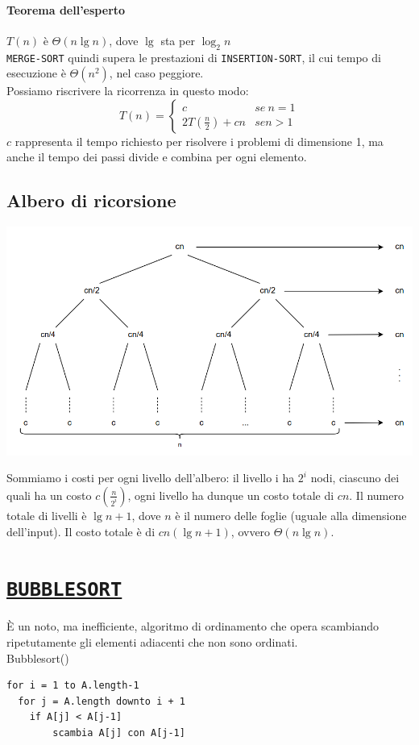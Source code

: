 \documentclass[11pt,a4paper]{article}
\begin{document}
\paragraph{Teorema dell'esperto} $T(n)$ è $\Theta(n \lg n)$, dove $\lg$ sta per $\log_2 n$
\medskip\\
\texttt{MERGE-SORT} quindi supera le prestazioni di \texttt{INSERTION-SORT}, il cui tempo di esecuzione è $\Theta(n^2)$, nel caso peggiore.\medskip\\
Possiamo riscrivere la ricorrenza in questo modo:
\[T(n)= \begin{cases}
          c & se\ n=1\\
          2T(\frac{n}{2})+cn & se n > 1
        \end{cases}
\]
$c$ rappresenta il tempo richiesto per risolvere i problemi di dimensione 1, ma anche il tempo dei passi divide e combina per ogni elemento.

\subsection{Albero di ricorsione}
\begin{center}
      \includegraphics[scale=0.36]{img/alberodiricorsione.png}
\end{center}
Sommiamo i costi per ogni livello dell’albero: il livello i ha $2^i$ nodi, ciascuno dei quali
ha un costo $c(\frac{n}{2^i})$, ogni livello ha dunque un costo totale di $cn$.
Il numero totale di livelli è $\lg n+1$, dove $n$ è il numero delle foglie (uguale alla dimensione dell’input). Il costo totale è di $cn(\lg n +1)$, ovvero $\Theta(n \lg n)$.

\section{\href{https://upload.wikimedia.org/wikipedia/commons/c/c8/Bubble-sort-example-300px.gif}{\texttt{BUBBLESORT}}}
È un noto, ma inefficiente, algoritmo di ordinamento che opera scambiando ripetutamente gli elementi adiacenti che non sono ordinati.\medskip\\
Bubblesort()
\begin{lstlisting}
for i = 1 to A.length-1
  for j = A.length downto i + 1
  	if A[j] < A[j-1]
  		scambia A[j] con A[j-1]
\end{lstlisting}
\end{document}
